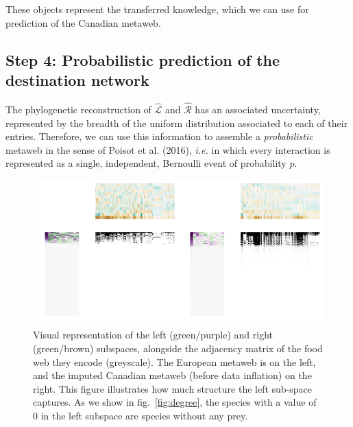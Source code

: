 \documentclass[11pt]{article}
\makeatletter
\def\maxwidth{\ifdim\Gin@nat@width>\linewidth\linewidth
\else\Gin@nat@width\fi}
\let\Oldincludegraphics\includegraphics
\renewcommand{\includegraphics}[1]{\Oldincludegraphics[width=\maxwidth]{#1}}
\makeatother
\begin{document}
These objects represent the transferred knowledge, which we can use for
prediction of the Canadian metaweb.

\hypertarget{step-4-probabilistic-prediction-of-the-destination-network}{%
\subsection{Step 4: Probabilistic prediction of the destination
network}\label{step-4-probabilistic-prediction-of-the-destination-network}}

The phylogenetic reconstruction of \(\hat{\mathcal{L}}\) and
\(\hat{\mathcal{R}}\) has an associated uncertainty, represented by the
breadth of the uniform distribution associated to each of their entries.
Therefore, we can use this information to assemble a
\emph{probabilistic} metaweb in the sense of Poisot et al. (2016),
\emph{i.e.} in which every interaction is represented as a single,
independent, Bernoulli event of probability \(p\).

\begin{figure}
\hypertarget{fig:subspaces}{%
\centering
\includegraphics{figures/figure-subspaces.png}
\caption{Visual representation of the left (green/purple) and right
(green/brown) subspaces, alongside the adjacency matrix of the food web
they encode (greyscale). The European metaweb is on the left, and the
imputed Canadian metaweb (before data inflation) on the right. This
figure illustrates how much structure the left sub-space captures. As we
show in fig.~\ref{fig:degree}, the species with a value of 0 in the left
subspace are species without any prey.}\label{fig:subspaces}
}
\end{figure}
\end{document}
